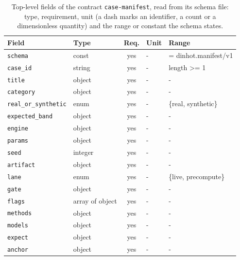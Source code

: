 \begin{table}[t]\centering\footnotesize
\caption{Top-level fields of the contract \texttt{case-manifest}, read from its schema file: type, requirement, unit (a dash marks an identifier, a count or a dimensionless quantity) and the range or constant the schema states.}\label{tab:contract-case-manifest}
\begin{tabular}{@{}l l c l >{\raggedright\arraybackslash}p{}@{}}\toprule Field & Type & Req. & Unit & Range\\\midrule
\texttt{\scriptsize schema} & const & yes & - & = dinhot.manifest/v1\\
\texttt{\scriptsize case\_id} & string & yes & - & length >= 1\\
\texttt{\scriptsize title} & object & yes & - & -\\
\texttt{\scriptsize category} & object & yes & - & -\\
\texttt{\scriptsize real\_or\_synthetic} & enum & yes & - & \{real, synthetic\}\\
\texttt{\scriptsize expected\_band} & object & yes & - & -\\
\texttt{\scriptsize engine} & object & yes & - & -\\
\texttt{\scriptsize params} & object & yes & - & -\\
\texttt{\scriptsize seed} & integer & yes & - & -\\
\texttt{\scriptsize artifact} & object & yes & - & -\\
\texttt{\scriptsize lane} & enum & yes & - & \{live, precompute\}\\
\texttt{\scriptsize gate} & object & yes & - & -\\
\texttt{\scriptsize flags} & array of object & yes & - & -\\
\texttt{\scriptsize methods} & object & yes & - & -\\
\texttt{\scriptsize models} & object & yes & - & -\\
\texttt{\scriptsize expect} & object & yes & - & -\\
\texttt{\scriptsize anchor} & object & yes & - & -\\
\bottomrule\end{tabular}\end{table}

